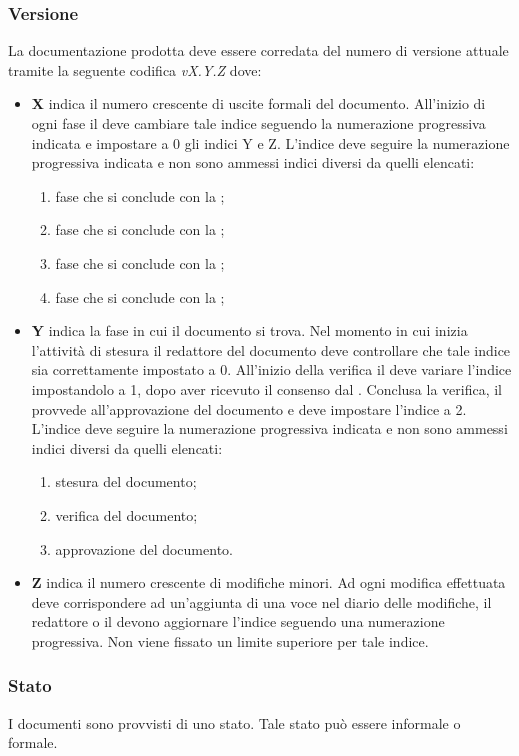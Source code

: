 \documentclass[12pt,a4paper]{article}
\begin{document}
\subsubsection{Versione} \label{Versione}
La documentazione prodotta deve essere corredata del numero di versione attuale tramite la seguente codifica \emph{vX.Y.Z} dove:
\begin{itemize}
	\item \textbf{X} indica il numero crescente di uscite formali del documento. All'inizio di ogni fase il \PM deve cambiare tale indice seguendo la numerazione progressiva indicata e impostare a 0 gli indici Y e Z. L'indice deve seguire la numerazione progressiva indicata e non sono ammessi indici diversi da quelli elencati:
	\begin{enumerate}
		\item fase che si conclude con la \RR;
		\item fase che si conclude con la \RP;
		\item fase che si conclude con la \RQ;
		\item fase che si conclude con la \RA;
	\end{enumerate}
	\item \textbf{Y} indica la fase in cui il documento si trova. Nel momento in cui inizia l'attività di stesura il redattore del documento deve controllare che tale indice sia correttamente impostato a 0. All'inizio della verifica il \VR{} deve variare l'indice impostandolo a 1, dopo aver ricevuto il consenso dal \PM. Conclusa la verifica, il \PM{} provvede all'approvazione del documento e deve impostare l'indice a 2. L'indice deve seguire la numerazione progressiva indicata e non sono ammessi indici diversi da quelli elencati:
	\begin{enumerate}[start=0]
		\item stesura del documento;
		\item verifica del documento;
		\item approvazione del documento.
	\end{enumerate}
	\item \textbf{Z} indica il numero crescente di modifiche minori. Ad ogni modifica effettuata deve corrispondere ad un'aggiunta di una voce nel diario delle modifiche, il redattore o il \VR devono aggiornare l'indice seguendo una numerazione progressiva. Non viene fissato un limite superiore per tale indice.
\end{itemize}

\subsubsection{Stato}
I documenti sono provvisti di uno stato. Tale stato può essere informale o formale.
\end{document}
